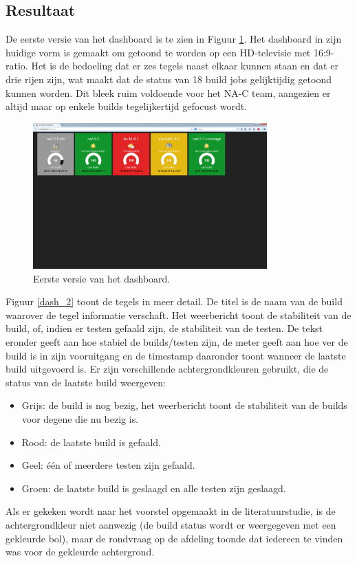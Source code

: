 \documentclass[10pt,a4paper]{article}
\begin{document}
\subsection{Resultaat}
\label{resultaat}
De eerste versie van het dashboard is te zien in Figuur \ref{dash_1}. Het dashboard in zijn huidige vorm is gemaakt om getoond te worden op een HD-televisie met 16:9-ratio. Het is de bedoeling dat er zes tegels naast elkaar kunnen staan en dat er drie rijen zijn, wat maakt dat de status van 18 build jobs gelijktijdig getoond kunnen worden. Dit bleek ruim voldoende voor het NA-C team, aangezien er altijd maar op enkele builds tegelijkertijd gefocust wordt.

\begin{figure}[ht!]
\centering
\includegraphics[width=90mm]{dashboard_screenshot1.png}
\caption{Eerste versie van het dashboard.} 
\label{dash_1}
\end{figure}

Figuur \ref{dash_2} toont de tegels in meer detail. De titel is de naam van de build waarover de tegel informatie verschaft. Het weerbericht toont de stabiliteit van de build, of, indien er testen gefaald zijn, de stabiliteit van de testen. De tekst eronder geeft aan hoe stabiel de builds/testen zijn, de meter geeft aan hoe ver de build is in zijn vooruitgang en de timestamp daaronder toont wanneer de laatste build uitgevoerd is.
Er zijn verschillende achtergrondkleuren gebruikt, die de status van de laatste build weergeven:
\begin{itemize}
\item Grijs: de build is nog bezig, het weerbericht toont de stabiliteit van de builds voor degene die nu bezig is.
\item Rood: de laatste build is gefaald.
\item Geel: \'e\'en of meerdere testen zijn gefaald.
\item Groen: de laatste build is geslaagd en alle testen zijn geslaagd. 
\end{itemize}
Als er gekeken wordt naar het voorstel opgemaakt in de literatuurstudie, is de achtergrondkleur niet aanwezig (de build status wordt er weergegeven met een gekleurde bol), maar de rondvraag op de afdeling toonde dat iedereen te vinden was voor de gekleurde achtergrond.
\end{document}
